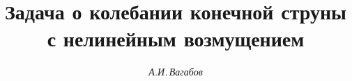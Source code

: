 

 


% 


 


\newcommand{\intl}{\int\limits} 


\newcommand{\myfrac}[2]{\frac{\partial #1}{\partial #2}} 


\newcommand{\const}{\operatorname{const}} 


\newcommand{\re}{\operatorname{Re}} 


\newcommand{\im}{\operatorname{Im}} 


\newcommand{\tts}[1]{} 


\renewcommand{\baselinestretch}{0.95}


 




  


\setcounter{page}{17} 












 


\author{\it А.И.\,Вагабов} 




\title{Задача о колебании конечной струны\\ 


с нелинейным возмущением} 


 


\date{} 




\pagestyle{plain} %


